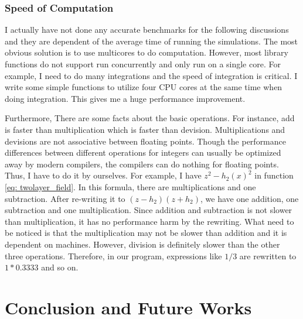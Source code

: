 \documentclass[12pt]{report}
\begin{document}
    \subsection{Speed of Computation}
      I actually have not done any accurate benchmarks for the following discussions and they are 
      dependent of the average time of running the simulations.
      The most obvious solution is to use multicores to do computation. However, most library functions 
      do not support run concurrently and only run on a single core. For example, I need to do many 
      integrations and the speed of integration is critical. I write some simple functions to 
      utilize four CPU cores at the same time when doing integration. 
      This gives me a huge performance improvement.

      Furthermore, There are some facts about the basic operations. For instance, add is 
      faster than multiplication which is faster than devision. Multiplications and devisions 
      are not associative between floating points. Though the performance differences between 
      different operations for integers can usually be optimized away by modern compilers, 
      the compilers can do nothing for floating points. Thus, I have to do it by ourselves. 
      For example, I have $z^2 - h_2\left(x\right)^2$ in function \ref{eq: twolayer_field}.
      In this formula, there are multiplications and one subtraction. After re-writing it to 
      $\left(z-h_2\right)\left(z + h_2\right)$, we have one addition, one subtraction and one 
      multiplication. Since addition and subtraction is not slower than multiplication, it 
      has no performance harm by the rewriting. What need to be noticed is that the 
      multiplication may not be slower than addition
      and it is dependent on machines. However, division is definitely slower than the other three operations. 
      Therefore, in our program, expressions like $1 / 3$ are rewritten to $1*0.3333$ and so on.  

  
\chapter{Conclusion and Future Works}
\end{document}
